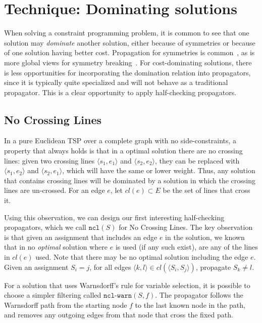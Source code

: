 \documentclass[runningheads]{llncs}
\newcommand{\cons}[1]{\texttt{#1}}
\begin{document}
\section{Technique: Dominating solutions}
\label{sec:hf-examples:dominating}

When solving a constraint programming problem, it is common to see
that one solution may \emph{dominate} another solution, either because
of symmetries or because of one solution having better
cost. Propagation for symmetries is common~\cite{matrixsymmetry}, as
is more global views for symmetry breaking~\cite{LDSB}. For
cost-dominating solutions, there is less opportunities for
incorporating the domination relation into propagators, since it is
typically quite specialized and will not behave as a traditional
propagator. This is a clear opportunity to apply half-checking
propagators.

\subsection{No Crossing Lines}
\label{sec:ncl}

In a pure Euclidean TSP over a complete graph with no side-constraints, a
property that always holds is that in a optimal solution there are no
crossing lines: given two crossing lines
$\langle s_1,e_1 \rangle$ and $\langle s_2,e_2 \rangle$, they can be
replaced with $\langle s_1,e_2 \rangle$ and $\langle s_2,e_1 \rangle$,
which will have the same or lower weight.  Thus, any solution that
contains crossing lines will be dominated by a solution in which the
crossing lines are un-crossed. For an edge $e$, let
$cl(e)\subset E$ be the set of lines that cross it.

Using this observation, we can design our first interesting
half-checking propagators, which we call $\cons{ncl}(S)$ for No
Crossing Lines. The key
observation is that given an assignment that includes an edge $e$ in
the solution, we known that in no \emph{optimal} solution where $e$ is used
(if any such exist), are any of the lines in $cl(e)$ used. Note that
there may be no optimal solution including the edge $e$.
Given an assignment $S_i = j$, for all edges
$\langle k,l \rangle\in cl(\langle S_i,S_j \rangle)$, propagate
$S_k \neq l$.

For a solution that uses Warnsdorff's rule for variable selection, it
is possible to choose a simpler filtering called
$\cons{ncl-warn}(S,f)$. The propagator follows the Warnsdorff path
from the starting node $f$ to the last known node in the
path, and removes any outgoing edges from that node that cross the fixed path.
\end{document}
